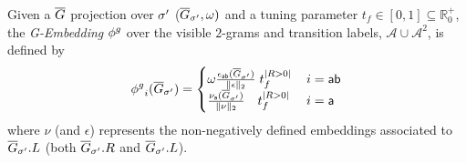 \begin{definition}[G-Embedding]\label{def:ppne}
Given a $\overline{G}$ projection over ${\sigma'}$ ($\overline{G}_{\sigma'},\omega)$ and a tuning parameter $t_f\in[0,1]\subseteq\mathbb{R}^+_{0}$, the \emph{G-Embedding} ${\phi^{g}}$ over the visible $2$-grams and transition labels, $\mathcal{A}\cup\mathcal{A}^2$, is defined by
$${\phi^{g}}_{i}(\overline{G}_{\sigma'})=\begin{cases}
	\omega \frac{\epsilon_{\mathsf{ab}}(\overline{G}_{\sigma'})}{\|\epsilon\|_2}\;t_f^{|R>0|}\, & {i}=\mathsf{ab}\\
	\frac{\nu_{\mathsf{a}}(\overline{G}_{\sigma'})}{\|\nu\|_2}\;\;\;\,t_f^{|R>0|}\, & {i}=\mathsf{a}\\
\end{cases}$$
where $\nu$ (and $\epsilon$) represents the non-negatively defined embeddings associated to $\overline{G}_{\sigma'}.L$ (both $\overline{G}_{\sigma'}.R$ and $\overline{G}_{\sigma'}.L$).
\end{definition}
